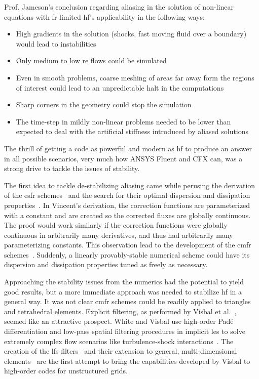 Prof. Jameson's conclusion regarding aliasing in the solution of non-linear equations with \gls{fr} limited \gls{hf}'s applicability in the following ways:
\begin{itemize}
\item High gradients in the solution (shocks, fast moving fluid over a boundary) would lead to instabilities
\item Only medium to low \gls{re} flows could be simulated
\item Even in smooth problems, coarse meshing of areas far away form the regions of interest could lead to an unpredictable halt in the computations
\item Sharp corners in the geometry could stop the simulation
\item The time-step in mildly non-linear problems needed to be lower than expected to deal with the artificial stiffness introduced by aliased solutions
\end{itemize}

The thrill of getting a code as powerful and modern as \gls{hf} to produce an answer in all possible scenarios, very much how ANSYS Fluent and CFX can, was a strong drive to tackle the issues of stability.

The first idea to tackle de-stabilizing aliasing came while perusing the derivation of the \gls{esfr} schemes~\cite{vincent2011new} and the search for their optimal dispersion and dissipation properties~\cite{asthana2014high}. In Vincent's derivation, the correction functions are parameterized with a constant and are created so the corrected fluxes are globally continuous. The proof would work similarly if the correction functions were globally continuous in arbitrarily many derivatives, and thus had arbitrarily many parameterizing constants. This observation lead to the development of the \gls{cmfr} schemes~\cite{lopez2015cmfr}. Suddenly, a linearly provably-stable numerical scheme could have its dispersion and dissipation properties tuned as freely as necessary.

Approaching the stability issues from the numerics had the potential to yield good results, but a more immediate approach was needed to stabilize \gls{hf} in a general way. It was not clear \gls{cmfr} schemes could be readily applied to triangles and tetrahedral elements. Explicit filtering, as performed by Visbal et al.~\cite{visbal2003implicit}, seemed like an attractive prospect. White and Visbal use high-order Pad\'e differentiation and low-pass spatial filtering procedures in implicit \gls{les} to solve extremely complex flow scenarios like turbulence-shock interactions~\cite{white2015investigation}. The creation of the \gls{lfs} filters~\cite{asthana2014} and their extension to general, multi-dimensional elements~\cite{lopez2015stabilization} are the first attempt to bring the capabilities developed by Visbal to high-order codes for unstructured grids.
